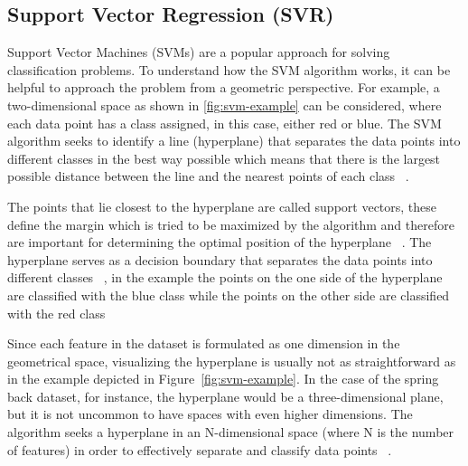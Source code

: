 {%


\subsection{Support Vector Regression (SVR)}\label{subsec:support-vector-regression-(svr)}
Support Vector Machines (SVMs) are a popular approach for solving classification problems.
To understand how the SVM algorithm works, it can be helpful to approach the problem from a geometric perspective.
For example, a two-dimensional space as shown in \cref{fig:svm-example} can be considered, where each data point
has a class assigned, in this case, either red or blue.
The SVM algorithm seeks to identify a line (hyperplane) that separates the data points into different classes in the
best way possible which means that there is the largest possible distance between the line and the
nearest points of each class
~\cite[pp. 92--96]{muller_introductionmachinelearning_2016}.

The points that lie closest to the hyperplane are called support vectors, these define the margin which is tried to be
maximized by the algorithm and therefore are important for determining the optimal position of the hyperplane
~\cite[p. 42]{awad_efficientlearningmachines_2015}.
The hyperplane serves as a decision boundary that separates the data points into different
classes~\cite[p. 11]{awad_efficientlearningmachines_2015}
, in the example the points on the one side of the hyperplane are classified with the blue class while the
points on the other side are classified with the red class

Since each feature in the dataset is formulated as one dimension in the geometrical space, visualizing the hyperplane
is usually not as straightforward as in the example depicted in Figure~\ref{fig:svm-example}.
In the case of the spring back dataset, for instance, the hyperplane would be a three-dimensional plane, but it is
not uncommon to have spaces with even higher dimensions.
The algorithm seeks a hyperplane in an N-dimensional space (where N is the number of features) in order to
effectively separate and classify data points
~\cite[]{awad_efficientlearningmachines_2015}.

}
